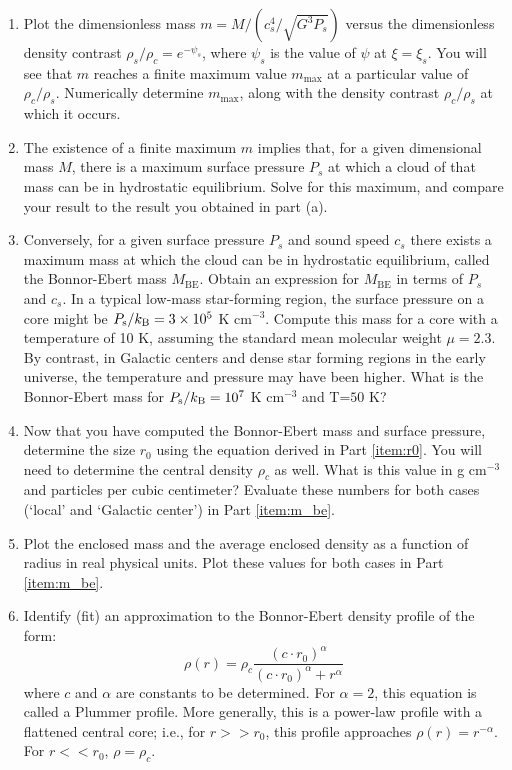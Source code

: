 \documentclass{article}
\begin{document}
\begin{enumerate}
\item Plot the dimensionless mass $m = M/(c_s^4/\sqrt{G^3 P_s})$ versus the dimensionless density contrast $\rho_s/\rho_c=e^{-\psi_s}$, where $\psi_s$ is the value of $\psi$ at $\xi=\xi_s$. You will see that $m$ reaches a finite maximum value $m_{\mathrm{max}}$ at a particular value of $\rho_c/\rho_s$. Numerically determine $m_{\mathrm{max}}$, along with the density contrast $\rho_c/\rho_s$ at which it occurs.
\item The existence of a finite maximum $m$ implies that, for a given dimensional mass $M$, there is a maximum surface pressure $P_s$ at which a cloud of that mass can be in hydrostatic equilibrium. Solve for this maximum, and compare your result to the result you obtained in part (a).
\item Conversely, for a given surface pressure $P_s$ and sound speed $c_s$ there exists a maximum mass at which the cloud can be in hydrostatic equilibrium, called the Bonnor-Ebert mass $M_{\mathrm{BE}}$. Obtain an expression for $M_{\mathrm{BE}}$ in terms of $P_s$ and $c_s$. In a typical low-mass star-forming region, the surface pressure on a core might be $P_{\mathrm{s}}/k_{\rm B} = 3\times 10^5$ K cm$^{-3}$. Compute this mass for a core with a temperature of 10 K, assuming the standard mean molecular weight $\mu=2.3$.\\
    By contrast, in Galactic centers and dense star forming regions in the early universe, the temperature and pressure may have been higher.  What is the Bonnor-Ebert mass for $P_{\mathrm{s}}/k_{\rm B} = 10^7$ K cm$^{-3}$ and T=$50$ K?
    \label{item:m_be}


\item Now that you have computed the Bonnor-Ebert mass and surface pressure, determine the size $r_0$ using the equation derived in Part \ref{item:r0}.
    You will need to determine the central density $\rho_c$ as well.  What is this value in g cm$^{-3}$ and particles per cubic centimeter?
    Evaluate these numbers for both cases (`local' and `Galactic center') in Part \ref{item:m_be}.

\item Plot the enclosed mass and the average enclosed density as a function of radius in real physical units.
    Plot these values for both cases in Part \ref{item:m_be}.

\item Identify (fit) an approximation to the Bonnor-Ebert density profile of the form:
    \begin{displaymath}
        \rho(r) = \rho_c \frac{(c \cdot r_0)^\alpha}{(c \cdot r_0)^\alpha + r^\alpha}
    \end{displaymath}
    where $c$ and $\alpha$ are constants to be determined.  
    For $\alpha=2$, this equation is called a Plummer profile.  More generally, this
    is a power-law profile with a flattened central core; i.e., for $r>>r_0$, this
    profile approaches $\rho(r) = r^{-\alpha}$.  For $r<<r_0$, $\rho=\rho_c$.


\end{enumerate}
\end{document}
